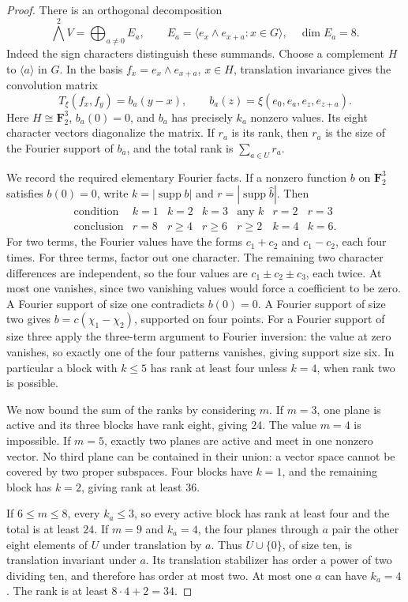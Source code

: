 \documentclass[11pt]{article}
\theoremstyle{definition}
\theoremstyle{remark}
\begin{document}
\begin{proof}
There is an orthogonal decomposition
\[
 \bigwedge^2V=\bigoplus_{a\ne0}E_a,
 \qquad E_a=\langle e_x\wedge e_{x+a}:x\in G\rangle,
 \quad \dim E_a=8.
\]
Indeed the sign characters distinguish these summands. Choose a complement $H$ to $\langle a\rangle$ in $G$. In the basis $f_x=e_x\wedge e_{x+a}$, $x\in H$, translation invariance gives the convolution matrix
\[
 T_\xi(f_x,f_y)=b_a(y-x),\qquad
 b_a(z)=\xi(e_0,e_a,e_z,e_{z+a}).
\]
Here $H\cong\mathbf F_2^3$, $b_a(0)=0$, and $b_a$ has precisely $k_a$ nonzero values. Its eight character vectors diagonalize the matrix. If $r_a$ is its rank, then $r_a$ is the size of the Fourier support of $b_a$, and the total rank is $\sum_{a\in U}r_a$.

We record the required elementary Fourier facts. If a nonzero function $b$ on $\mathbf F_2^3$ satisfies $b(0)=0$, write $k=|\operatorname{supp}b|$ and $r=|\operatorname{supp}\widehat b|$. Then
\[
\begin{array}{c|cccccc}
\text{condition}&k=1&k=2&k=3&\text{any }k&r=2&r=3\\
\hline
\text{conclusion}&r=8&r\ge4&r\ge6&r\ge2&k=4&k=6.
\end{array}
\]
For two terms, the Fourier values have the forms $c_1+c_2$ and $c_1-c_2$, each four times. For three terms, factor out one character. The remaining two character differences are independent, so the four values are $c_1\pm c_2\pm c_3$, each twice. At most one vanishes, since two vanishing values would force a coefficient to be zero. A Fourier support of size one contradicts $b(0)=0$. A Fourier support of size two gives $b=c(\chi_1-\chi_2)$, supported on four points. For a Fourier support of size three apply the three-term argument to Fourier inversion: the value at zero vanishes, so exactly one of the four patterns vanishes, giving support size six. In particular a block with $k\le5$ has rank at least four unless $k=4$, when rank two is possible.

We now bound the sum of the ranks by considering $m$. If $m=3$, one plane is active and its three blocks have rank eight, giving $24$. The value $m=4$ is impossible. If $m=5$, exactly two planes are active and meet in one nonzero vector. No third plane can be contained in their union: a vector space cannot be covered by two proper subspaces. Four blocks have $k=1$, and the remaining block has $k=2$, giving rank at least $36$.

If $6\le m\le8$, every $k_a\le3$, so every active block has rank at least four and the total is at least $24$. If $m=9$ and $k_a=4$, the four planes through $a$ pair the other eight elements of $U$ under translation by $a$. Thus $U\cup\{0\}$, of size ten, is translation invariant under $a$. Its translation stabilizer has order a power of two dividing ten, and therefore has order at most two. At most one $a$ can have $k_a=4$. The rank is at least $8\cdot4+2=34$.


\end{proof}
\end{document}

